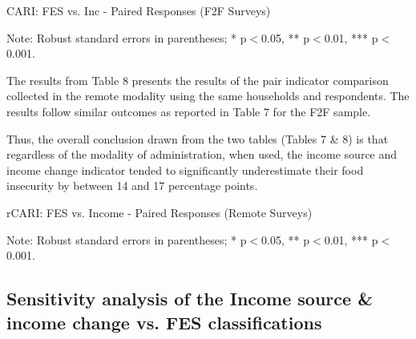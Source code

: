 \documentclass[11pt,harvard]{article}
\begin{document}
	\begin{table}[htbp]
	\centering
	\begin{adjustbox}{max width=\textwidth}
		\begin{threeparttable}
			\caption{CARI: FES vs. Inc - Paired Responses (F2F Surveys)}
			\scriptsize
			 
			\label{tab:BF_F2F_Paired_ttest_Full}
			\begin{tablenotes}
				\item Note: Robust standard errors in parentheses; * p$<$0.05, ** p$<$0.01, *** p$<$0.001.
			\end{tablenotes}
		\end{threeparttable}
	\end{adjustbox}
	\end{table}
	
	The results from Table 8 presents the results of the pair indicator comparison collected in the remote modality using the same households and respondents. The results follow similar outcomes as reported in Table 7 for the F2F sample. 
	
	Thus, the overall conclusion drawn from the two tables (Tables 7 \& 8) is that regardless of the modality of administration, when used, the income source and income change indicator tended to significantly underestimate their food insecurity by between 14 and 17 percentage points.
	
	\begin{table}[htbp]
		\centering
		\begin{adjustbox}{max width=\textwidth}
			\begin{threeparttable}
				\caption{rCARI: FES vs. Income - Paired Responses (Remote Surveys)}
				\scriptsize
				 
				\label{tab:BF_RM_Paired_ttest_Full}
				\begin{tablenotes}
					\item Note: Robust standard errors in parentheses; * p$<$0.05, ** p$<$0.01, *** p$<$0.001.
				\end{tablenotes}
			\end{threeparttable}
		\end{adjustbox}
	\end{table}
	
	\subsection{Sensitivity analysis of the Income source \& income change vs. FES classifications}
	
\end{document}
